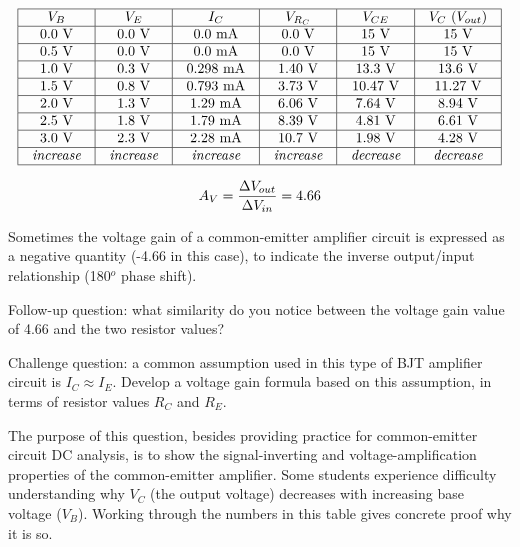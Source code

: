 $$\vbox{\offinterlineskip
\halign{\strut
\vrule \quad\hfil # \ \hfil & 
\vrule \quad\hfil # \ \hfil & 
\vrule \quad\hfil # \ \hfil & 
\vrule \quad\hfil # \ \hfil & 
\vrule \quad\hfil # \ \hfil & 
\vrule \quad\hfil # \ \hfil \vrule \cr
\noalign{\hrule}
%
$V_B$ & $V_E$ & $I_C$  & $V_{R_C}$ & $V_{CE}$ & $V_C$ ($V_{out}$) \cr
%
\noalign{\hrule}
%
0.0 V & 0.0 V & 0.0 mA & 0.0 V & 15 V & 15 V \cr
%
\noalign{\hrule}
%
0.5 V & 0.0 V & 0.0 mA & 0.0 V & 15 V & 15 V \cr
%
\noalign{\hrule}
%
1.0 V & 0.3 V & 0.298 mA & 1.40 V & 13.3 V & 13.6 V \cr
%
\noalign{\hrule}
%
1.5 V & 0.8 V & 0.793 mA & 3.73 V & 10.47 V & 11.27 V \cr
%
\noalign{\hrule}
%
2.0 V & 1.3 V & 1.29 mA & 6.06 V & 7.64 V & 8.94 V \cr
%
\noalign{\hrule}
%
2.5 V & 1.8 V & 1.79 mA & 8.39 V & 4.81 V & 6.61 V \cr
%
\noalign{\hrule}
%
3.0 V & 2.3 V & 2.28 mA & 10.7 V & 1.98 V & 4.28 V \cr
%
\noalign{\hrule}
%
{\it increase} & {\it increase} & {\it increase} & {\it increase} & {\it decrease} & {\it decrease} \cr
%
\noalign{\hrule}
} %
}$$ %

$$A_V = {\Delta V_{out} \over \Delta V_{in}} = 4.66$$

Sometimes the voltage gain of a common-emitter amplifier circuit is expressed as a negative quantity (-4.66 in this case), to indicate the inverse output/input relationship (180$^{o}$ phase shift).

\vskip 10pt

Follow-up question: what similarity do you notice between the voltage gain value of 4.66 and the two resistor values?

\vskip 10pt

Challenge question: a common assumption used in this type of BJT amplifier circuit is $I_C \approx I_E$.  Develop a voltage gain formula based on this assumption, in terms of resistor values $R_C$ and $R_E$.







The purpose of this question, besides providing practice for common-emitter circuit DC analysis, is to show the signal-inverting and voltage-amplification properties of the common-emitter amplifier.  Some students experience difficulty understanding why $V_C$ (the output voltage) decreases with increasing base voltage ($V_B$).  Working through the numbers in this table gives concrete proof why it is so.

